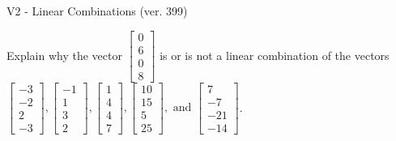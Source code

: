 \begin{exercise}
  \begin{exerciseTitle}V2 - Linear Combinations (ver. 399)\end{exerciseTitle}
  \begin{exerciseStatement}
    Explain why the vector \(\left[\begin{array}{c}
0 \\
6 \\
0 \\
8
\end{array}\right]\)  is or is not a linear 
	combination of the vectors \(\left[\begin{array}{c}
-3 \\
-2 \\
2 \\
-3
\end{array}\right] , \left[\begin{array}{c}
-1 \\
1 \\
3 \\
2
\end{array}\right] , \left[\begin{array}{c}
1 \\
4 \\
4 \\
7
\end{array}\right] , \left[\begin{array}{c}
10 \\
15 \\
5 \\
25
\end{array}\right] , \text{ and } \left[\begin{array}{c}
7 \\
-7 \\
-21 \\
-14
\end{array}\right]\).
	



\end{exerciseStatement}
\end{exercise}
